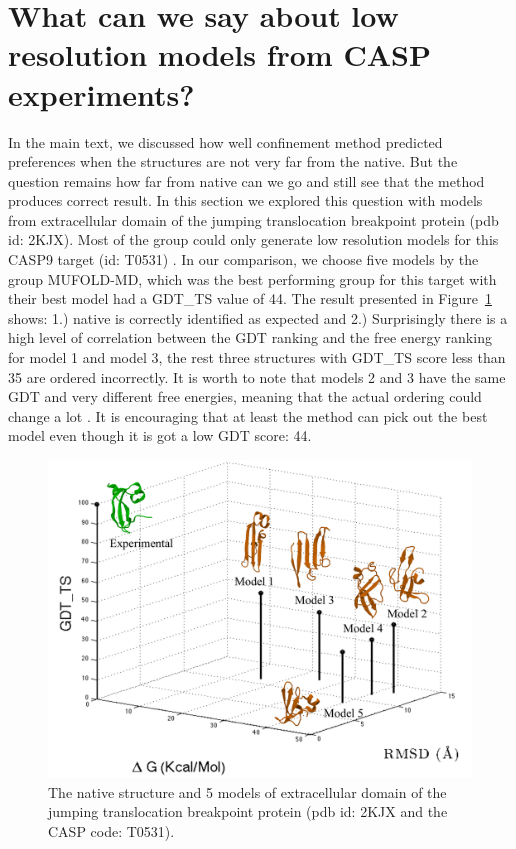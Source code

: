 \documentclass[12pt]{article}
\begin{document}
\section*{What can we say about low resolution models from CASP experiments?}

In the main text, we discussed how well confinement method predicted preferences when the structures are not very far from the
native. But the question remains how far from native can we go and still see that the method produces correct result. In
this section we explored this question with models from  extracellular domain of the jumping translocation breakpoint
protein (pdb id: 2KJX). Most of the group could only generate low resolution models for this CASP9 target (id: T0531) .
In our comparison, we choose five models by the group MUFOLD-MD, which was the best performing group for this target
with their best model had a GDT\_TS value of 44. The result presented in Figure~\ref{fig:T0531} shows: 1.) native is
correctly identified as expected and 2.) Surprisingly there is a high level of correlation between the GDT ranking and
the free energy ranking for model 1 and model 3, the rest three structures with GDT\_TS score less than 35  are ordered
incorrectly. It is worth to note that models 2 and 3 have the same GDT and very different free energies, meaning that
the actual ordering could change a lot \cite{Perez2012}. It is encouraging that at least the method can pick out the
best model even though it is got a low GDT score: 44.

\begin{figure}
\begin{center}
\includegraphics[width=3.5 in]{T0531.pdf}
\end{center}
\caption{The native structure and 5 models of extracellular domain of the jumping translocation breakpoint protein (pdb
    id: 2KJX and the CASP code: T0531).}
\label{fig:T0531}
\end{figure}
\end{document}
